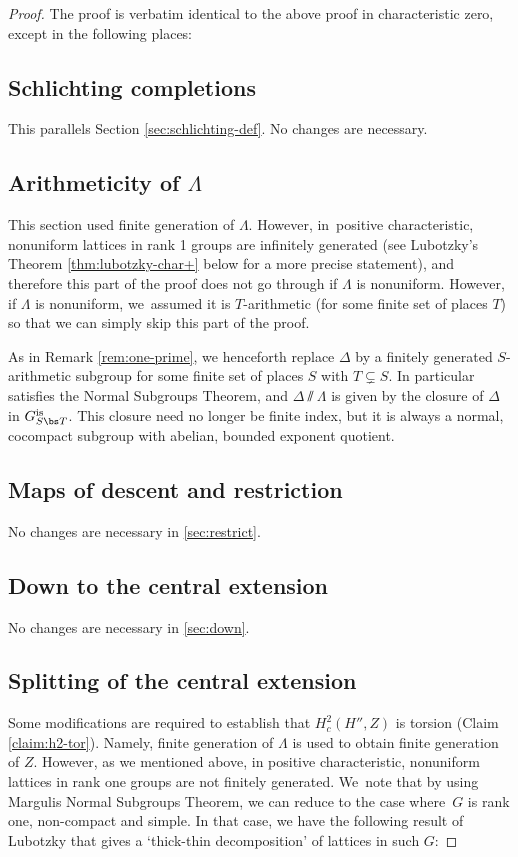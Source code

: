 \begin{proof} The proof is verbatim identical to the above proof in characteristic zero, except in the following places:

\subsection{Schlichting completions} This parallels Section \ref{sec:schlichting-def}. No changes are necessary.

\subsection{Arithmeticity of $\Lambda$} \label{sec:arithm-char+}
This section used finite generation of $\Lambda$. However, in~positive characteristic, nonuniform lattices in rank 1 groups are infinitely generated (see Lubotzky's Theorem \ref{thm:lubotzky-char+} below for a more precise statement), and therefore this part of the proof does not go through if $\Lambda$ is nonuniform. However, if $\Lambda$ is nonuniform, we~assumed it is $T$-arithmetic (for some finite set of places $T$) so that we can simply skip this part of the proof.

As in Remark \ref{rem:one-prime}, we henceforth replace $\Delta$ by a finitely generated $S$-arithmetic subgroup for some finite set of places $S$ with $T\subsetneq S$. In particular satisfies the Normal Subgroups Theorem, and $\Delta\sslash\Lambda$ is given by the closure of $\Delta$ in $G_{S\bs T}^{\textup{is}}$. This closure need no longer be finite index, but it is always a normal, cocompact subgroup with abelian, bounded exponent quotient.

\subsection{Maps of descent and restriction} No changes are necessary in \ref{sec:restrict}.

\subsection{Down to the central extension} No changes are necessary in \ref{sec:down}.

\subsection{Splitting of the central extension} Some modifications are required to establish that $H^2_c(H'',Z)$ is torsion (Claim \ref{claim:h2-tor}). Namely, finite generation of $\Lambda$ is used to obtain finite generation of $Z$. However, as we mentioned above, in positive characteristic, nonuniform lattices in rank one groups are not finitely generated. We~note that by using Margulis Normal Subgroups Theorem, we can reduce to the case where~$G$ is rank one, non-compact and simple. In that case, we have the following result of Lubotzky that gives a `thick-thin decomposition' of lattices in such $G$:


\end{proof}
